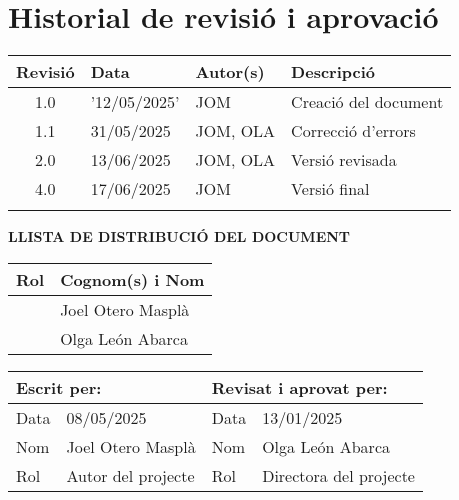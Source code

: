\vspace*{0cm}

\chapter*{Historial de revisió i aprovació}

\begin{tabularx}{\textwidth}{|c|l|l|X|}
  \hline
    \textbf{Revisió} & \textbf{Data} & \textbf{Autor(s)} & \textbf{Descripció} \\
  \hline
    1.0 & '12/05/2025' & JOM & Creació del document \\
  \hline
    1.1 & 31/05/2025 & JOM, OLA & Correcció d'errors \\
  \hline
    2.0 & 13/06/2025 & JOM, OLA & Versió revisada \\
  \hline
    4.0 & 17/06/2025 & JOM & Versió final \\
  \hline
    & & & \\
  \hline
\end{tabularx}

\vspace{1cm}

\textbf{LLISTA DE DISTRIBUCIÓ DEL DOCUMENT}

\begin{tabularx}{\textwidth}{|l|X|}
  \hline
    \textbf{Rol} & \textbf{Cognom(s) i Nom} \\
  \hline
    [Estudiant] & Joel Otero Masplà \\
  \hline
    [Directora del projecte] & Olga León Abarca \\
  \hline
\end{tabularx}

\vspace{1cm}

\begin{tabularx}{\textwidth}{|l|X||l|X|}
  \hline
    \multicolumn{2}{|l||}{\textbf{Escrit per:}}  &  \multicolumn{2}{l|}{\textbf{Revisat i aprovat per:}} \\
  \hline
    Data &  08/05/2025 & Data &  13/01/2025 \\
  \hline
    Nom &  Joel Otero Masplà & Nom &  Olga León Abarca \\
  \hline
    Rol & Autor del projecte & Rol & Directora del projecte \\
  \hline
\end{tabularx}

